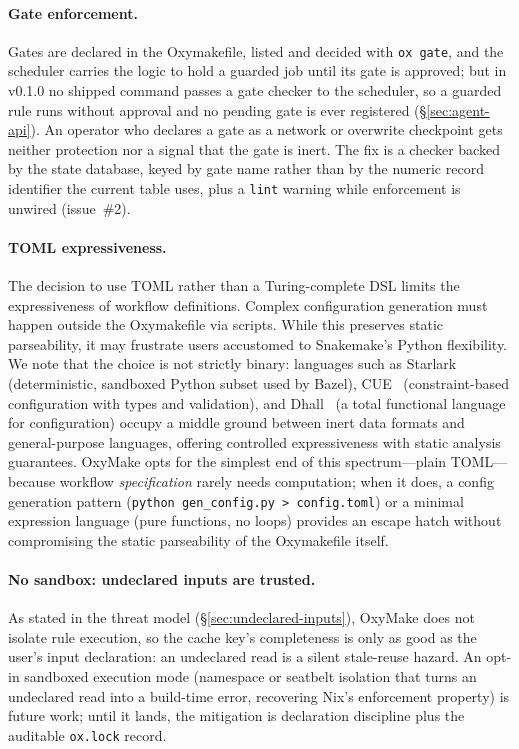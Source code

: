 \documentclass[12pt,a4paper]{article}
\newcommand{\code}[1]{{\texttt{\small\color{inlinecode}#1}}}
\begin{document}
\paragraph{Gate enforcement.}
Gates are declared in the Oxymakefile, listed and decided with
\code{ox gate}, and the scheduler carries the logic to hold a guarded
job until its gate is approved; but in v0.1.0 no shipped command passes a
gate checker to the scheduler, so a guarded rule runs without approval
and no pending gate is ever registered (\S\ref{sec:agent-api}). An
operator who declares a gate as a network or overwrite checkpoint gets
neither protection nor a signal that the gate is inert. The fix is a
checker backed by the state database, keyed by gate name rather than by
the numeric record identifier the current table uses, plus a \code{lint}
warning while enforcement is unwired (issue~\#2).

\paragraph{TOML expressiveness.}
The decision to use TOML rather than a Turing-complete DSL limits the
expressiveness of workflow definitions. Complex configuration generation
must happen outside the Oxymakefile via scripts. While this preserves static
parseability, it may frustrate users accustomed to Snakemake's Python
flexibility. We note that the choice is not strictly binary: languages such
as Starlark~\cite{starlark} (deterministic, sandboxed Python subset used by
Bazel), CUE~\cite{cue} (constraint-based configuration with types and
validation), and Dhall~\cite{dhall} (a total functional language for
configuration) occupy a middle ground between inert data formats and
general-purpose languages, offering controlled expressiveness with static
analysis guarantees. OxyMake opts for the simplest end of this spectrum---plain
TOML---because workflow \emph{specification} rarely needs computation; when it
does, a config generation pattern (\code{python gen\_config.py > config.toml})
or a minimal expression language (pure functions, no loops) provides an escape
hatch without compromising the static parseability of the Oxymakefile itself.

\paragraph{No sandbox: undeclared inputs are trusted.}
As stated in the threat model (\S\ref{sec:undeclared-inputs}), OxyMake
does not isolate rule execution, so the cache key's completeness is
only as good as the user's input declaration: an undeclared read is a
silent stale-reuse hazard. An opt-in sandboxed execution mode
(namespace or seatbelt isolation that turns an undeclared read into a
build-time error, recovering Nix's enforcement property) is future work;
until it lands, the mitigation is declaration discipline plus the
auditable \code{ox.lock} record.
\end{document}
